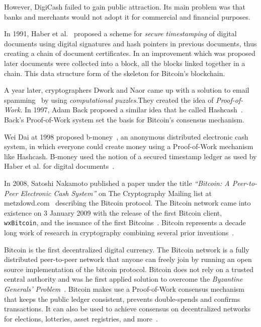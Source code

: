 However, DigiCash failed to gain public attraction. Its main problem was that  banks and merchants would not adopt it for commercial and financial purposes.

In 1991, Haber et al.~\cite{Haber1991} proposed a scheme for \textit{secure timestamping} of digital documents using digital signatures and hash pointers in previous documents, thus creating a chain of document certificates. In an improvement which was proposed later documents were collected into a block, all the blocks linked together in a chain. This data structure form of the skeleton for Bitcoin's blockchain.

A year later, cryptographers Dwork and Naor came up with a solution to email spamming~\cite{Dwork1993} by using \textit{computational puzzles}.They created the idea of \textit{Proof-of-Work}. In 1997, Adam Back proposed a similar idea that he called Hashcash~\cite{hash_cash}. Back's Proof-of-Work system set the basis for Bitcoin's consensus mechanism.

Wei Dai at 1998 proposed b-money~\cite{b_money}, an anonymous distributed electronic cash system, in which everyone could create money using a Proof-of-Work mechanism like Ηashcash. B-money used the notion of a secured timestamp ledger as used by Haber et al. for digital documents~\cite{Haber1991}.

In 2008, Satoshi Nakamoto published a paper under the title \textit{``Bitcoin: A Peer-to-Peer Electronic Cash System''} on The Cryptography Mailing list at metzdowd.com~\cite{satoshi_mailing_list} describing the Bitcoin protocol. The Bitcoin network came into existence on 3 January 2009 with the release of the first Bitcoin client, \verb|wxBitcoin|, and the issuance of the first Bitcoins~\cite{btc_client, btc_first_block}. Bitcoin represents a decade long work of research in cryptography combining several prior inventions~\cite{antonopoulos2014mastering}.

Bitcoin is the first decentralized digital currency. The Bitcoin network is a fully distributed peer-to-peer network that anyone can freely join by running an open source implementation of the bitcoin protocol. Bitcoin does not rely on a trusted central authority and was he first applied solution to overcome the \textit{Byzantine Generals' Problem}~\cite{byzantine_fault_tolerance}. Bitcoin makes use a Proof-of-Work consensus mechanism that keeps  the public ledger consistent, prevents double-spends and confirms transactions. It can also be used to achieve consensus on decentralized networks for elections, lotteries, asset registries, and more~\cite{antonopoulos2014mastering}.


